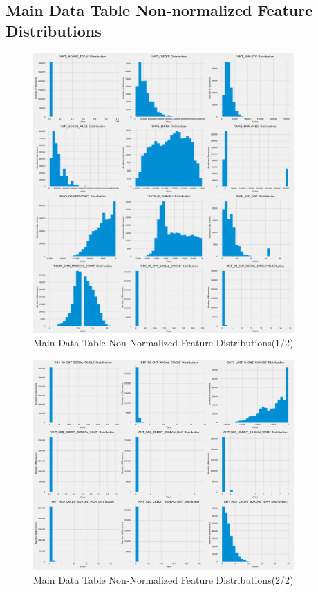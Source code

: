 \documentclass[12pt, letterpaper]{article}
\begin{document}
\begin{appendices}
\pagebreak

\subsection{Main Data Table Non-normalized Feature Distributions}
\label{nonnormalfeaturedistibs}

\begin{figure}[ht]
\includegraphics[width=0.89\textwidth]{main-data-table-non-normal-feature-distribs-p1}
\centering
\caption{Main Data Table Non-Normalized Feature Distributions(1/2)}
\end{figure}

\pagebreak

\begin{figure}[ht]
\includegraphics[width=0.89\textwidth]{main-data-table-non-normal-feature-distribs-p2}
\centering
\caption{Main Data Table Non-Normalized Feature Distributions(2/2)}
\end{figure}

\pagebreak

\end{appendices}

\printbibliography
\end{document}
